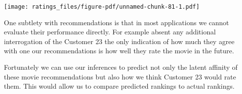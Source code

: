 \documentclass[
  letterpaper,
  DIV=11,
  numbers=noendperiod]{scrartcl}
\newenvironment{Shaded}{\begin{snugshade}}{\end{snugshade}}
\newcommand{\AttributeTok}[1]{\textcolor[rgb]{0.40,0.45,0.13}{#1}}
\newcommand{\ControlFlowTok}[1]{\textcolor[rgb]{0.00,0.23,0.31}{#1}}
\newcommand{\DecValTok}[1]{\textcolor[rgb]{0.68,0.00,0.00}{#1}}
\newcommand{\FunctionTok}[1]{\textcolor[rgb]{0.28,0.35,0.67}{#1}}
\newcommand{\NormalTok}[1]{\textcolor[rgb]{0.00,0.23,0.31}{#1}}
\newcommand{\OtherTok}[1]{\textcolor[rgb]{0.00,0.23,0.31}{#1}}
\newcommand{\SpecialCharTok}[1]{\textcolor[rgb]{0.37,0.37,0.37}{#1}}
\newcommand{\StringTok}[1]{\textcolor[rgb]{0.13,0.47,0.30}{#1}}
\begin{document}
\begin{Shaded}
\end{Shaded}

\texttt{[image: ratings\_files/figure-pdf/unnamed-chunk-81-1.pdf]}

One subtlety with recommendations is that in most applications we cannot
evaluate their performance directly. For example absent any additional
interrogation of the Customer 23 the only indication of how much they
agree with one our recommendations is how well they rate the movie in
the future.

Fortunately we can use our inferences to predict not only the latent
affinity of these movie recommendations but also how we think Customer
23 would rate them. This would allow us to compare predicted rankings to
actual rankings.
\end{document}
